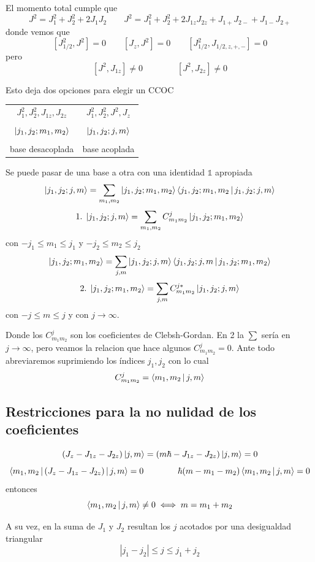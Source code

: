 \documentclass[10pt,oneside]{CBFT_book}
\begin{document}
El momento total  cumple que 
\[
	J^2 =  J_1^2 + J_2^2 + 2J_1J_2 \qquad 
	J^2 =  J_1^2 + J_2^2 + 2J_{1z}J_{2z} + J_{1+}J_{2-} + J_{1-}J_{2+}
\]
donde vemos que 
\[
	[J^2_{1/2},J^2] = 0 \qquad [J_z,J^2] = 0 \qquad [J^2_{1/2},J_{1/2,z,+,-}] = 0
\]
pero 
\[
	[ J^2 , J_{1z}] \neq 0  \qquad \qquad [ J^2 , J_{2z}] \neq 0
\]

Esto deja dos opciones para elegir un CCOC

\begin{center}
\begin{tabular}{|c|c|}
\hline 
$J_1^2, J_2^2, J_{1z}, J_{2z}$ & $J_1^2, J_2^2, J^2, J_{z}$ \\
& \\
$\Ket{j_1,j_2;m_1,m_2}$ & $\Ket{j_1,j_2;j,m}$ \\
& \\
base desacoplada & base acoplada \\
\hline
\end{tabular}
\end{center}

Se puede pasar de una base a otra con una identidad $\mathbb{1}$ apropiada
\[
	\Ket{j_1,j_2;j,m} = \sum_{m_1,m_2} \Ket{j_1,j_2;m_1,m_2}\Braket{j_1,j_2;m_1,m_2|j_1,j_2;j,m}
\]
\[
	1. \; \Ket{j_1,j_2;j,m} = \sum_{m_1,m_2} C_{m_1m_2}^j \Ket{j_1,j_2;m_1,m_2}
\]
con $-j_1 \leq m_1 \leq j_1$ y  $-j_2 \leq m_2 \leq j_2$
\[
	\Ket{j_1,j_2;m_1,m_2} = \sum_{j,m} \Ket{j_1,j_2;j,m}\Braket{j_1,j_2;j,m|j_1,j_2;m_1,m_2}
\]
\[
	2. \; \Ket{j_1,j_2;m_1,m_2} = \sum_{j,m} C_{m_1m_2}^{j*}\Ket{j_1,j_2;j,m}
\]
con $-j \leq m \leq j$ y con $j\to\infty$.

Donde los $C_{m_1 m_2}^j$ son los coeficientes de Clebsh-Gordan. En 2 la $\sum$ sería en $j\to\infty$, pero veamos la 
relacion que hace algunos $C_{m_1 m_2}^j=0$. Ante todo abreviaremos suprimiendo los índices $j_1,j_2$ con lo cual 
\[
	C_{m_1m_2}^{j} = \Braket{m_1,m_2|j,m}
\]

\subsection{Restricciones para la no nulidad de los coeficientes}

\[
	(J_{z} - J_{1z} - J_{2z})\Ket{j,m} = (m\hbar - J_{1z} - J_{2z})\Ket{j,m} = 0
\]
\[
	\Braket{m_1,m_2|(J_{z} - J_{1z} - J_{2z})|j,m}= 0 \qquad \qquad 
	\hbar(m-m_1-m_2)\Braket{m_1,m_2|j,m} = 0
\]
entonces
\[
	\Braket{m_1,m_2| j,m} \neq 0 \iff m = m_1 + m_2
\]

A su vez, en la suma de $J_1$ y $J_2$ resultan los $j$ acotados por una desigualdad triangular 
\[
	|j_1 - j_2| \leq j \leq j_1 + j_2
\]
\end{document}
